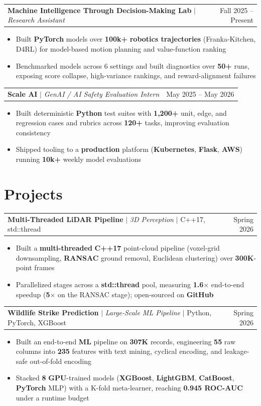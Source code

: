 \documentclass[letterpaper,10pt]{article}
\makeatletter
\newcommand{\resumeWorkHeading}[2]{%
  \vspace{2pt}\noindent
  \begin{tabular*}{\textwidth}{@{}l@{\extracolsep{\fill}}r@{}}
    #1 & #2 \\
  \end{tabular*}%
  \vspace{-2pt}
}
\newcommand{\resumeItemListStart}{\begin{itemize}}
\newcommand{\resumeItemListEnd}{\end{itemize}\vspace{3pt}}
\newcommand{\resumeItem}[1]{\item #1}
\makeatother
\begin{document}
\resumeWorkHeading
{\textbf{Machine Intelligence Through Decision-Making Lab} $|$ \emph{Research Assistant}}{Fall 2025 -- Present}
\resumeItemListStart
\resumeItem{Built \textbf{PyTorch} models over \textbf{100k+} \textbf{robotics trajectories} (Franka-Kitchen, D4RL) for model-based motion planning and value-function ranking}
\resumeItem{Benchmarked models across 6 settings and built diagnostics over \textbf{50+} runs, exposing score collapse, high-variance rankings, and reward-alignment failures}
\resumeItemListEnd

\resumeWorkHeading
{\textbf{Scale AI} $|$ \emph{GenAI / AI Safety Evaluation Intern}}{May 2025 -- May 2026}
\resumeItemListStart
\resumeItem{Built deterministic \textbf{Python} test suites with \textbf{1,200+} unit, edge, and regression cases and rubrics across \textbf{120+} tasks, improving evaluation consistency}
\resumeItem{Shipped tooling to a \textbf{production} platform (\textbf{Kubernetes}, \textbf{Flask}, \textbf{AWS}) running \textbf{10k+} weekly model evaluations}
\resumeItemListEnd

\section{Projects}
\resumeWorkHeading
{\textbf{Multi-Threaded LiDAR Pipeline} $|$ \emph{3D Perception} $|$ C++17, std::thread}{Spring 2026}
\resumeItemListStart
\resumeItem{Built a \textbf{multi-threaded} \textbf{C++17} point-cloud pipeline (voxel-grid downsampling, \textbf{RANSAC} ground removal, Euclidean clustering) over \textbf{300K}-point frames}
\resumeItem{Parallelized stages across a \textbf{std::thread} pool, measuring \textbf{1.6$\times$} end-to-end speedup (\textbf{5$\times$} on the RANSAC stage); open-sourced on \textbf{GitHub}}
\resumeItemListEnd

\resumeWorkHeading
{\textbf{Wildlife Strike Prediction} $|$ \emph{Large-Scale ML Pipeline} $|$ Python, PyTorch, XGBoost}{Spring 2026}
\resumeItemListStart
\resumeItem{Built an end-to-end \textbf{ML} pipeline on \textbf{307K} records, engineering \textbf{55} raw columns into \textbf{235} features with text mining, cyclical encoding, and leakage-safe out-of-fold encoding}
\resumeItem{Stacked \textbf{8} \textbf{GPU}-trained models (\textbf{XGBoost}, \textbf{LightGBM}, \textbf{CatBoost}, \textbf{PyTorch} MLP) with a K-fold meta-learner, reaching \textbf{0.945 ROC-AUC} under a runtime budget}
\resumeItemListEnd
\end{document}
